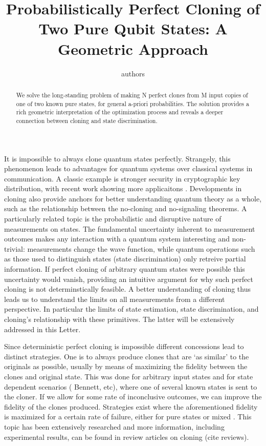 \documentclass[aps,prl,twocolumn,showpacs]{revtex4}
\begin{document}
  \title{Probabilistically Perfect Cloning of Two Pure Qubit States: A Geometric Approach}
  \author{authors}


  \begin{abstract}We solve the long-standing problem of making N perfect clones from M input copies of one of two known pure states, for general a-priori probabilities.  The solution provides a rich geometric interpretation of the optimization process and reveals a deeper connection between cloning and state discrimination.
\end{abstract}
\maketitle 

It is impossible to always clone quantum states perfectly.  Strangely, this phenomenon leads to advantages for quantum systems over classical systems in communication.  A classic example is stronger security in cryptographic key distribution, with recent work showing more applicaitons \cite{Pomarico}.  Developments in cloning also provide anchors for better understanding quantum theory as a whole, such as the relationship between the no-cloning and no-signaling theorems. A particularly related topic is the probabilistic and disruptive nature of measurements on states.  The fundamental uncertainty inherent to measurement outcomes makes any interaction with a quantum system interesting and non-trivial: measurements change the wave function, while quantum operations such as those used to distinguish states (state discrimination) only retreive partial information.  If perfect cloning of arbitrary quantum states were possible this uncertainty would vanish, providing an intuitive argument for why such perfect cloning is not determinstically feasible.  A better understanding of cloning thus leads us to understand the limits on all measurements from a different perspective.  In particular the limits of  state estimation, state discrimination, and cloning's relationship with these primitives. The latter will be extensively addressed in this Letter.




Since deterministic perfect cloning is impossible different concessions lead to distinct strategies. One is to always produce clones that are `as similar' to the originals as possible, usually by means of maximizing the fidelity between the clones and original state. This was done for arbitrary input states \cite{Gisin1,Buzek,Brub} and for state dependent scenarios ( Bennett, etc), where one of several known states is sent to the cloner.  If we allow for some rate of inconclusive outcomes, we can improve the fidelity of the clones produced. Strategies exist where the aforementioned fidelity is maximized for a certain rate of failure, either for pure states \cite{Chefles1} or mixed \cite{Fiurasek, Setaski}. This topic has been extensively researched and more information, including experimental results, can be found in review articles on cloning (cite reviews).
\end{document}
